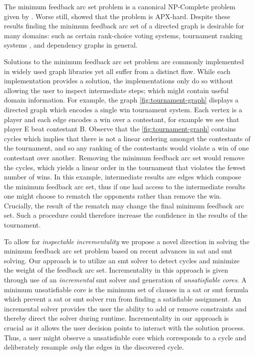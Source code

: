 \label{section:introduction}%

The minimum feedback arc set problem is a canonical NP-Complete problem given by
\citet{KarpNPComplete}. Worse still, \citet{kannthesis} showed that the problem
is APX-hard. Despite these results finding the minimum feedback arc set of a
directed graph is desirable for many domains: such as certain rank-choice voting
systems, tournament ranking systems \citet{tournamentsRfast}, and dependency graphs
in general.

Solutions to the minimum feedback arc set problem are commonly implemented in
widely used graph libraries yet all suffer from a distinct flaw. While each
implementation provides a solution, the implementations only do so without
allowing the user to inspect intermediate steps; which might contain useful
domain information. For example, the graph \autoref{fig:tournament-graph}
displays a directed graph which encodes a single win tournament system. Each
vertex is a player and each edge encodes a win over a contestant, for example we
see that player E beat contestant B. Observe that the
\autoref{fig:tournament-graph} contains cycles which implies that there is not a
linear ordering amongst the contestants of the tournament, and so any ranking of
the contestants would violate a win of one contestant over another. Removing the
minimum feedback arc set would remove the cycles, which yields a linear order in
the tournament that violates the fewest number of wins. In this example,
intermediate results are edges which compose the minimum feedback arc set, thus
if one had access to the intermediate results one might choose to rematch the
opponents rather than remove the win. Crucially, the result of the rematch may
change the final minimum feedback arc set. Such a procedure could therefore
increase the confidence in the results of the tournament.

To allow for \emph{inspectable incrementality} we propose a novel direction in
solving the minimum feedback arc set problem based on recent advances in
\ac{sat} and \ac{smt} solving. Our approach is to utilize an \ac{smt} solver to
detect cycles and minimize the weight of the feedback arc set. Incrementality in
this approach is given through use of an \emph{incremental} \ac{smt} solver and
generation of \emph{unsatisfiable cores}. A minimum unsatisfiable core is the
minimum set of clauses in a \ac{sat} or \ac{smt} formula which prevent a
\ac{sat} or \ac{smt} solver run from finding a satisfiable assignment. An
incremental solver provides the user the ability to add or remove constraints
and thereby direct the solver during runtime. Incrementality in our approach is
crucial as it allows the user decision points to interact with the solution
process. Thus, a user might observe a unsatisfiable core which corresponds to a
cycle and deliberately resample \emph{only} the edges in the discovered cycle.

